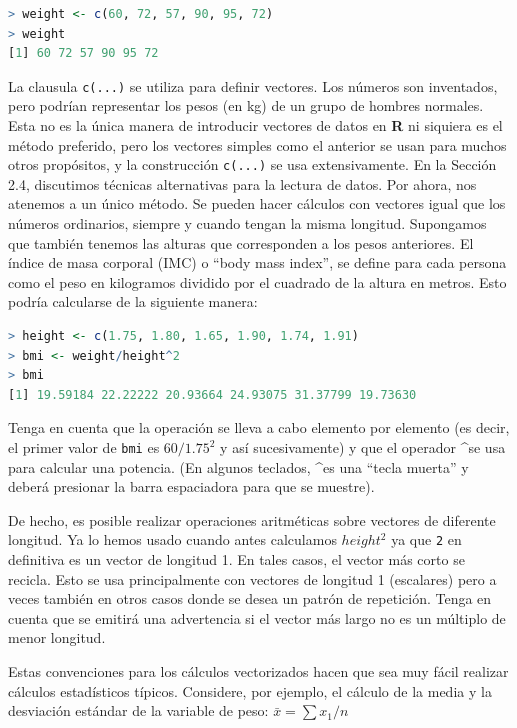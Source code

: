 \begin{lstlisting}[language=R]
> weight <- c(60, 72, 57, 90, 95, 72)
> weight
[1] 60 72 57 90 95 72
\end{lstlisting}

La clausula \texttt{c(...)} se utiliza para definir vectores. Los números son
inventados, pero podrían representar los pesos (en kg) de un grupo de hombres
normales. Esta no es la única manera de introducir vectores de datos en
\textbf{R} ni siquiera es el método preferido, pero los vectores simples como
el anterior se usan para muchos otros propósitos, y la construcción
\texttt{c(...)} se usa extensivamente. En la Sección 2.4, discutimos técnicas
alternativas para la lectura de datos. Por ahora, nos atenemos a un único
método. Se pueden hacer cálculos con vectores igual que los números ordinarios,
siempre y cuando tengan la misma longitud.  Supongamos que también tenemos las
alturas que corresponden a los pesos anteriores. El índice de masa corporal
(IMC) o ``body mass index'', se define para cada persona como el peso en
kilogramos dividido por el cuadrado de la altura en metros. Esto podría
calcularse de la siguiente manera:

\begin{lstlisting}[language=R]
> height <- c(1.75, 1.80, 1.65, 1.90, 1.74, 1.91)
> bmi <- weight/height^2
> bmi
[1] 19.59184 22.22222 20.93664 24.93075 31.37799 19.73630
\end{lstlisting}

Tenga en cuenta que la operación se lleva a cabo elemento por elemento (es
decir, el primer valor de \texttt{bmi} es $60/1.75^2$ y así sucesivamente) y
que el operador \textasciicircum se usa para calcular una potencia. (En algunos
teclados, \textasciicircum es una ``tecla muerta'' y deberá presionar la barra
espaciadora para que se muestre).

De hecho, es posible realizar operaciones aritméticas sobre vectores de
diferente longitud. Ya lo hemos usado cuando antes calculamos $height^2$
ya que \texttt{2} en definitiva es un vector de longitud 1. En tales casos, el
vector más corto se recicla. Esto se usa principalmente con vectores de
longitud 1 (escalares) pero a veces también en otros casos donde se desea un
patrón de repetición. Tenga en cuenta que se emitirá una advertencia si el
vector más largo no es un múltiplo de menor longitud.

Estas convenciones para los cálculos vectorizados hacen que sea muy fácil
realizar cálculos estadísticos típicos. Considere, por ejemplo, el cálculo
de la media y la desviación estándar de la variable de peso: $\bar{x} = \sum x_1/n$

